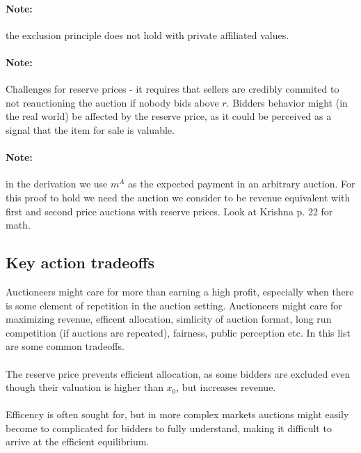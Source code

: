 \paragraph{Note:} the exclusion principle does not hold with private affiliated values.

\paragraph{Note:} Challenges for reserve prices - it requires that sellers are credibly commited to not reauctioning the auction if nobody bids above $r$. Bidders behavior might (in the real world) be affected by the reserve price, as it could be perceived as a signal that the item for sale is valuable.

\paragraph{Note:} in the derivation we use $m^A$ as the expected payment in an arbitrary auction. For this proof to hold we need the auction we consider to be revenue equivalent with first and second price auctions with reserve prices. Look at Krishna p. 22 for math.


\subsection{Key action tradeoffs}
Auctioneers might care for more than earning a high profit, especially when there is some element of repetition in the auction setting. Auctioneers might care for maximizing revenue, efficent allocation, simlicity of auction format, long run competition (if auctions are repeated), fairness, public perception etc. In this list are some common tradeoffs.
\\ \\
The reserve price prevents efficient allocation, as some bidders are excluded even though their valuation is higher than $x_0$, but increases revenue.
\\ \\
Efficency is often sought for, but in more complex markets auctions might easily become to complicated for bidders to fully understand, making it difficult to arrive at the efficient equilibrium.

